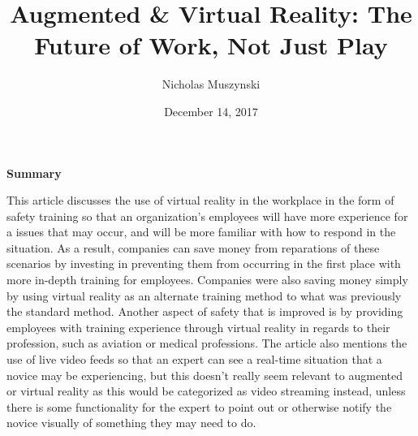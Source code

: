 \documentclass{article}
\begin{document}
\title{Augmented & Virtual Reality: The Future of Work, Not Just Play}
\author{Nicholas Muszynski}
\date{December 14, 2017}

\maketitle

\textbf{Summary}
\newline

This article discusses the use of virtual reality in the workplace in the form of safety training so that an organization's employees will have more experience for a issues that may occur, and will be more familiar with how to respond in the situation. As a result, companies can save money from reparations of these scenarios by investing in preventing them from occurring in the first place with more in-depth training for employees. Companies were also saving money simply by using virtual reality as an alternate training method to what was previously the standard method. Another aspect of safety that is improved is by providing employees with training experience through virtual reality in regards to their profession, such as aviation or medical professions. The article also mentions the use of live video feeds so that an expert can see a real-time situation that a novice may be experiencing, but this doesn't really seem relevant to augmented or virtual reality as this would be categorized as video streaming instead, unless there is some functionality for the expert to point out or otherwise notify the novice visually of something they may need to do.

\nocite{VRforWorkCite}



\end{document}
